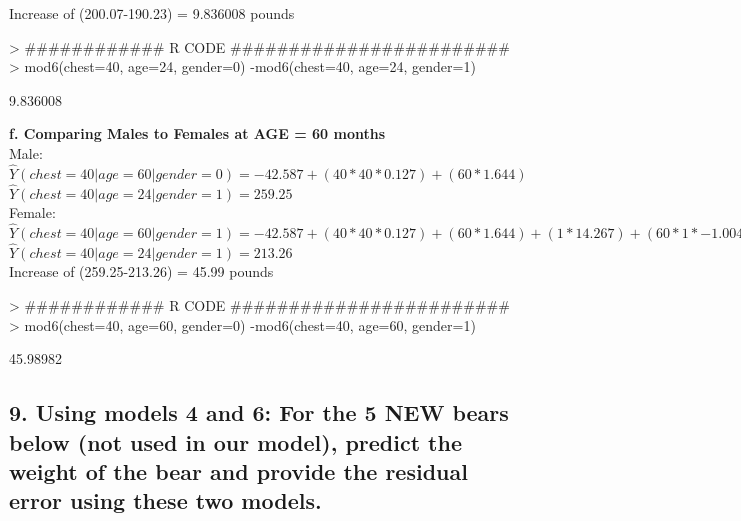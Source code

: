 \documentclass{article}
\begin{document}
\noindent Increase of (200.07-190.23) = 9.836008 pounds \\


\begin{Schunk}
\begin{Sinput}
> ############ R CODE ########################
> mod6(chest=40, age=24, gender=0) -mod6(chest=40, age=24, gender=1)
\end{Sinput}
\begin{Soutput}
[1] 9.836008
\end{Soutput}
\end{Schunk}

\noindent \textbf{f. Comparing Males to Females at AGE = 60 months}\\

\noindent Male: $\hat{Y}(chest=40|age=60|gender=0) = -42.587 + (40*40*0.127) + (60*1.644)$ \\ 
$\hat{Y}(chest=40|age=24|gender=1) = 259.25 $ \\ 

\noindent Female: $\hat{Y}(chest=40|age=60|gender=1) = -42.587 + (40*40*0.127) + (60*1.644) + (1*14.267) + (60*1*-1.00427258)$ \\ 
$\hat{Y}(chest=40|age=24|gender=1) = 213.26 $ \\ 

\noindent Increase of (259.25-213.26) = 45.99 pounds \\







\begin{Schunk}
\begin{Sinput}
> ############ R CODE ########################
> mod6(chest=40, age=60, gender=0) -mod6(chest=40, age=60, gender=1)
\end{Sinput}
\begin{Soutput}
[1] 45.98982
\end{Soutput}
\end{Schunk}

\newpage
\subsection*{9. Using models 4 and 6: For the 5 NEW bears below (not used in our model), predict the weight of the bear and provide the residual error using these two models.}\\
\end{document}
